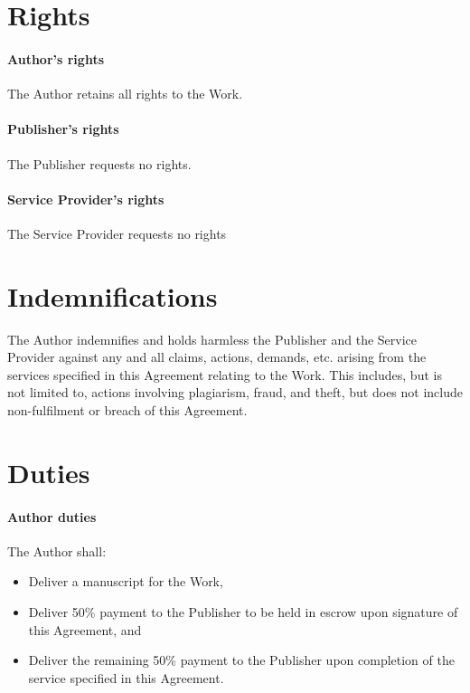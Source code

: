 \documentclass[12pt,letterpaper,oneside]{article}
\def\TheWork{the Work} %
\begin{document}
\section{Rights}

\paragraph{Author's rights}

The Author retains all rights to \TheWork.

\paragraph{Publisher's rights}

The Publisher requests no rights.

\paragraph{Service Provider's rights}

The Service Provider requests no rights

\section{Indemnifications}

The Author indemnifies and holds harmless the Publisher and the Service Provider against any and all claims, actions, demands, etc. arising from the services specified in this Agreement relating to \TheWork. This includes, but is not limited to, actions involving plagiarism, fraud, and theft, but does not include non-fulfilment or breach of this Agreement.

\section{Duties}

\paragraph{Author duties}

The Author shall:

\begin{itemize}
    \item Deliver a manuscript for \TheWork,
    \item Deliver 50\% payment to the Publisher to be held in escrow upon signature of this Agreement, and
    \item Deliver the remaining 50\% payment to the Publisher upon completion of the service specified in this Agreement.
\end{itemize}
\end{document}

